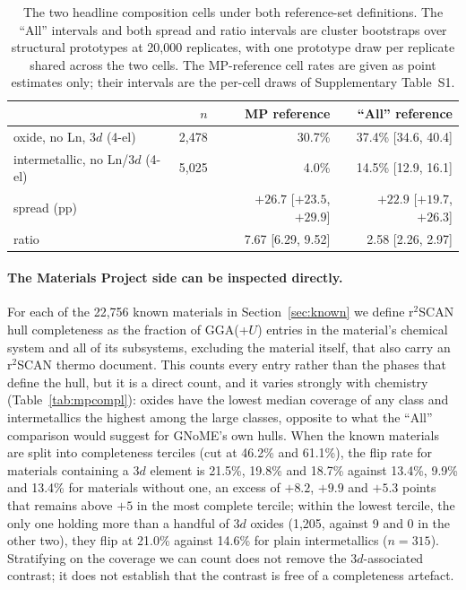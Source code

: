 \documentclass[11pt]{article}
\begin{document}
\begin{table}[htbp]\centering
\caption{The two headline composition cells under both reference-set definitions. The
``All'' intervals and both spread and ratio intervals are cluster bootstraps over
structural prototypes at 20{,}000 replicates, with one prototype draw per replicate
shared across the two cells. The MP-reference cell rates are given as point estimates
only; their intervals are the per-cell draws of Supplementary Table~S1.}
\label{tab:allcells}
\small\begin{tabular}{lrrr}
\toprule
 & $n$ & MP reference & ``All'' reference \\
\midrule
oxide, no Ln, 3$d$ (4-el)        & 2{,}478 & 30.7\% & 37.4\% [34.6, 40.4] \\
intermetallic, no Ln/3$d$ (4-el) & 5{,}025 & \phantom{0}4.0\% & 14.5\% [12.9, 16.1] \\
\midrule
spread (pp)                      &         & $+26.7$ [$+23.5$, $+29.9$] & $+22.9$ [$+19.7$, $+26.3$] \\
ratio                            &         & 7.67 [6.29, 9.52] & 2.58 [2.26, 2.97] \\
\bottomrule
\end{tabular}
\end{table}

\paragraph{The Materials Project side can be inspected directly.} For each of the
22{,}756 known materials in Section~\ref{sec:known} we define r$^2$SCAN hull completeness
as the fraction of GGA(+$U$) entries in the material's chemical system and all of its
subsystems, excluding the material itself, that also carry an r$^2$SCAN thermo document.
This counts every entry rather than the phases that define the hull, but it is a direct
count, and it varies strongly with chemistry (Table~\ref{tab:mpcompl}): oxides have the
lowest median coverage of any class and intermetallics the highest among the large
classes, opposite to what the ``All'' comparison would suggest for GNoME's own hulls. When the known materials are split into completeness
terciles (cut at 46.2\% and 61.1\%), the flip rate for materials containing a 3$d$
element is 21.5\%, 19.8\% and 18.7\% against 13.4\%, 9.9\% and 13.4\% for materials
without one, an excess of $+8.2$, $+9.9$ and $+5.3$ points that remains above $+5$ in the most
complete tercile; within the lowest tercile, the only one holding more than a handful of
3$d$ oxides (1{,}205, against 9 and 0 in the other two), they flip at 21.0\% against
14.6\% for plain intermetallics ($n=315$). Stratifying on the coverage we can count does not remove the
3$d$-associated contrast; it does not establish that the contrast is free of a
completeness artefact.
\end{document}
